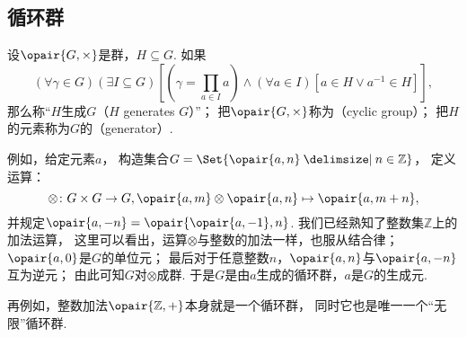 \subsection{循环群}
\begin{definition}
设\(\opair{G,\times}\)是群，\(H \subseteq G\).
如果\[
	(\forall \gamma \in G)
	(\exists I \subseteq G)
	[
		(\gamma=\textstyle\prod_{a \in I} a)
		\land
		(\forall a \in I)[a \in H \lor a^{-1} \in H]
	],
\]
那么称“\(H\)生成\(G\)（\(H\) generates \(G\)）”；
把\(\opair{G,\times}\)称为（cyclic group）；
把\(H\)的元素称为\(G\)的（generator）.
\end{definition}


例如，给定元素\(a\)，
构造集合\(G = \Set{
	\opair{a,n}
	\given
	n\in\mathbb{Z}
}\)，
定义运算：\[
	\otimes\colon G \times G \to G,
	\opair{a,m}\otimes\opair{a,n}\mapsto\opair{a,m+n},
\]
并规定\(\opair{a,-n}=\opair{\opair{a,-1},n}\).
我们已经熟知了整数集\(\mathbb{Z}\)上的加法运算，
这里可以看出，运算\(\otimes\)与整数的加法一样，也服从结合律；
\(\opair{a,0}\)是\(G\)的单位元；
最后对于任意整数\(n\)，\(\opair{a,n}\)与\(\opair{a,-n}\)互为逆元；
由此可知\(G\)对\(\otimes\)成群.
于是\(G\)是由\(a\)生成的循环群，\(a\)是\(G\)的生成元.

再例如，整数加法\(\opair{\mathbb{Z},+}\)本身就是一个循环群，
同时它也是唯一一个“无限”循环群.



